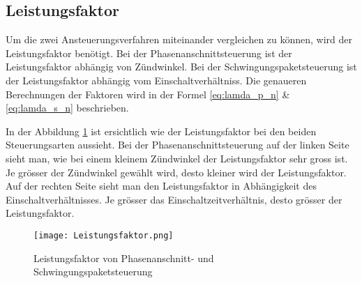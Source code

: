

\subsection{Leistungsfaktor}
Um die zwei Ansteuerungsverfahren miteinander vergleichen zu können, wird der Leistungsfaktor benötigt. Bei der Phasenanschnittsteuerung ist der Leistungsfaktor abhängig von Zündwinkel. Bei der Schwingungspaketsteuerung ist der Leistungsfaktor abhängig vom Einschaltverhältniss. Die genaueren Berechnungen der Faktoren wird in der Formel \ref{eq:lamda_p_n} \& \ref{eq:lamda_s_n} beschrieben. 

In der Abbildung \ref{fig:Leistungsfaktor} ist ersichtlich wie der Leistungsfaktor bei den beiden Steuerungsarten aussieht. Bei der Phasenanschnittsteuerung auf der linken Seite sieht man, wie bei einem kleinem Zündwinkel der Leistungsfaktor sehr gross ist. Je grösser der Zündwinkel gewählt wird, desto kleiner wird der Leistungsfaktor. Auf der rechten Seite sieht man den Leistungsfaktor in Abhängigkeit des Einschaltverhältnisses. Je grösser das Einschaltzeitverhältnis, desto grösser der Leistungsfaktor.  
\begin{figure}[ht!]
	\centering
	\texttt{[image: Leistungsfaktor.png]}	
	\caption{Leistungsfaktor von Phasenanschnitt- und Schwingungspaketsteuerung}\label{fig:Leistungsfaktor}
\end{figure}

